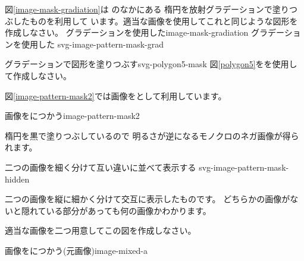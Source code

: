\iffalse
\begin{Problem}
 図形の内部を\Elm{pattern}で塗る方法と\Elm{mask}で切り抜く方法の特徴を比
 較しなさい。
\end{Problem}
\fi
\begin{Problem}\upshape\label{prob-image-mask-gradiation}
 図\ref{image-mask-gradiation}は
のなかにある
楕円を放射グラデーションで塗りつぶしたものを利用して
います。適当な画像を使用してこれと同じような図形を作成しなさい。
       {グラデーションを使用した}{image-mask-gradiation}
     {グラデーションを使用した\noexpand{}}
     {svg-image-pattern-mask-grad}
  \end{Problem}
{}
{グラデーションで図形を塗りつぶす}{svg-polygon5-mask}
{図\ref{polygon5}をを使用して作成しなさい。}
{\relax}

\iffalse\else
図\ref{image-pattern-mask2}では画像をとして利用しています。

{画像をにつかう}{image-pattern-mask2}

楕円を黒で塗りつぶしているので
明るさが逆になるモノクロのネガ画像が得られます。

\fi
{}
{二つの画像を細く分けて互い違いに並べて表示する}
{svg-image-pattern-mask-hidden}
{二つの画像を縦に細かく分けて交互に表示したものです。
どちらかの画像がないと隠れている部分があっても何の画像かわかります。
\par 適当な画像を二つ用意してこの図を作成しなさい。}

{画像をにつかう(元画像)}{image-mixed-a}

